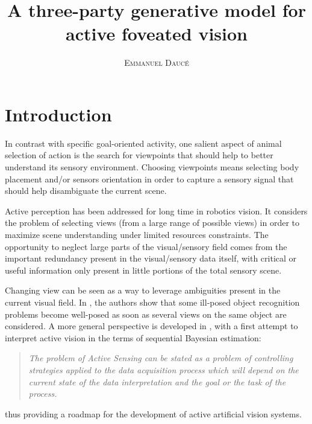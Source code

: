 \documentclass[12pt,twoside,openright]{article}
\title{\textbf{A three-party generative model for active foveated vision} }
\author{\textsc{Emmanuel Daucé}}%
\date{}
\begin{document}
	
\maketitle


	
\section{Introduction}

In contrast with specific goal-oriented activity, one salient aspect of animal selection of action is the search for viewpoints that should help to better understand its sensory environment. Choosing viewpoints means selecting body placement and/or sensors orientation in order to capture a sensory signal that should help disambiguate the current scene.  



Active perception has been addressed for long time in robotics vision. It considers the problem of selecting views (from a large range of possible views) in order to maximize scene understanding under limited resources constraints. The opportunity to neglect large parts of the {\color{blue} visual/sensory} field comes from the important redundancy present in the {\color{blue} visual/sensory} data itself, with critical or useful information only present in little portions of the total sensory scene.

Changing view can be seen as a way to leverage ambiguities present in the current visual field. In \cite{aloimonos1988active}, the authors show that some ill-posed object recognition problems become well-posed as soon as several views on the  same object are considered. 
A more general perspective is developed in \cite{bajcsy1988active}, with a first attempt to interpret active vision in the terms of sequential Bayesian estimation:
\begin{quote}
	\emph{The problem  of Active Sensing can be stated as a problem of controlling strategies 
		applied to the data acquisition process which will depend on the current state 
		of the data interpretation and  the  goal  or the  task of  the  process.}
\end{quote}
thus providing a roadmap for the development of active artificial vision systems.
\end{document}
